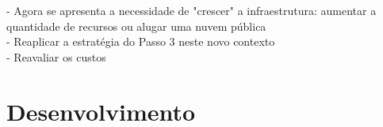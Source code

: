 \documentclass[tese,capa]{texufpel}
\begin{document}
- Agora se apresenta a necessidade de "crescer" a infraestrutura: aumentar a quantidade de recursos ou alugar uma nuvem pública\\
- Reaplicar a estratégia do Passo 3 neste novo contexto\\
- Reavaliar os custos\\

\chapter{Desenvolvimento}


\end{document}
